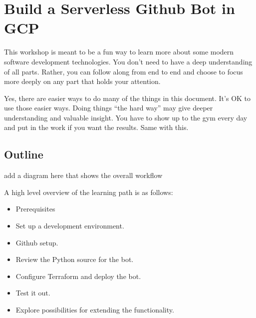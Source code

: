 







\section{\label{sec:Start}Build a Serverless Github Bot in GCP}
\vspace{2mm}

\justifying
This workshop is meant to be a fun way to learn more about some modern software development technologies.
You don't need to have a deep understanding of all parts. Rather, you can follow along from end to end
and choose to focus more deeply on any part that holds your attention.
\vspace{2mm}

\justifying
Yes, there are easier ways to do many of the things in this document. It's OK to use those easier ways.
Doing things ``the hard way'' may give deeper understanding and valuable insight. You have to show
up to the gym every day and put in the work if you want the results. Same with this.

\subsection{\label{sec:outline}Outline}

add a diagram here that shows the overall workflow

\justifying
A high level overview of the learning path is as follows:

\begin{raggedright}
	\begin{itemize}
		\item Prerequisites
		\item Set up a development environment.
		\item Github setup.
		\item Review the Python source for the bot.
		\item Configure Terraform and deploy the bot.
		\item Test it out.
		\item Explore possibilities for extending the functionality.
	\end{itemize}
\end{raggedright}
\vspace{2mm}

